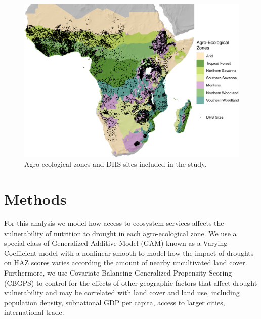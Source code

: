 \documentclass{article}
\begin{document}
\begin{figure}[h]
	\centering
	\includegraphics[width=0.8\linewidth]{AEZ_Sites.png}
	\caption{Agro-ecological zones and DHS sites included in the study.}
	\label{fig:AEZmap}
\end{figure}

\section{Methods}
For this analysis we model how access to ecosystem services affects the vulnerability of nutrition to drought in each agro-ecological zone.  We use a special class of Generalized Additive Model (GAM) known as a Varying-Coefficient model \cite{Wood2017} with a nonlinear smooth to model how the impact of droughts on HAZ scores varies according the amount of nearby uncultivated land cover.  Furthermore, we use Covariate Balancing Generalized Propensity Scoring (CBGPS) \cite{imai2014covariate} to control for the effects of other geographic factors that affect drought vulnerability and may be correlated with land cover and land use, including population density, subnational GDP per capita, access to larger cities, international trade.
\end{document}
